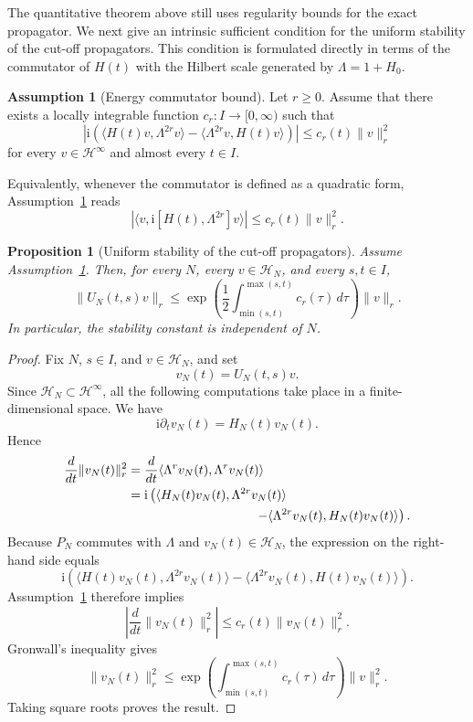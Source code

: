 \documentclass[11pt]{amsart}
\theoremstyle{plain}
\newtheorem{proposition}[theorem]{Proposition}
\theoremstyle{definition}
\newtheorem{assumption}[theorem]{Assumption}
\theoremstyle{remark}
\newcommand{\Hilb}{\mathcal H}
\newcommand{\ii}{\mathrm i}
\begin{document}
The quantitative theorem above still uses regularity bounds for the exact
propagator. We next give an intrinsic sufficient condition for the uniform
stability of the cut-off propagators. This condition is formulated directly
in terms of the commutator of \(H(t)\) with the Hilbert scale generated by
\(\Lambda=1+H_{0}\).

\begin{assumption}[Energy commutator bound]
\label{ass:energy-commutator-bound}
Let \(r\geq 0\). Assume that there exists a locally integrable function
\(c_{r}:I\to[0,\infty)\) such that
\[
\left|
\ii
\left(
\langle H(t)v,\Lambda^{2r}v\rangle
-
\langle \Lambda^{2r}v,H(t)v\rangle
\right)
\right|
\leq
c_{r}(t)\|v\|_{r}^{2}
\]
for every \(v\in\Hilb^{\infty}\) and almost every \(t\in I\).
\end{assumption}

Equivalently, whenever the commutator is defined as a quadratic form,
Assumption~\ref{ass:energy-commutator-bound} reads
\[
\left|
\langle v,\ii[H(t),\Lambda^{2r}]v\rangle
\right|
\leq
c_{r}(t)\|v\|_{r}^{2}.
\]

\begin{proposition}[Uniform stability of the cut-off propagators]
\label{prop:uniform-cutoff-stability}
Assume Assumption~\ref{ass:energy-commutator-bound}. Then, for every \(N\),
every \(v\in\Hilb_{N}\), and every \(s,t\in I\),
\[
\|U_{N}(t,s)v\|_{r}
\leq
\exp\left(
\frac{1}{2}
\int_{\min(s,t)}^{\max(s,t)}c_{r}(\tau)\,d\tau
\right)
\|v\|_{r}.
\]
In particular, the stability constant is independent of \(N\).
\end{proposition}

\begin{proof}
Fix \(N\), \(s\in I\), and \(v\in\Hilb_{N}\), and set
\[
v_{N}(t)=U_{N}(t,s)v.
\]
Since \(\Hilb_{N}\subset\Hilb^{\infty}\), all the following
computations take place in a finite-dimensional space. We have
\[
\ii\partial_{t}v_{N}(t)=H_{N}(t)v_{N}(t).
\]
Hence
\[
\begin{split}
\frac{d}{dt}\|v_{N}(t)\|_{r}^{2}
&=
\frac{d}{dt}
\langle \Lambda^{r}v_{N}(t),\Lambda^{r}v_{N}(t)\rangle
\\
&=
\ii
\left(
\langle H_{N}(t)v_{N}(t),\Lambda^{2r}v_{N}(t)\rangle
\right.
\\
&\hspace{35mm}\left.
-
\langle \Lambda^{2r}v_{N}(t),H_{N}(t)v_{N}(t)\rangle
\right).
\end{split}
\]
Because \(P_{N}\) commutes with \(\Lambda\) and
\(v_{N}(t)\in\Hilb_{N}\), the expression on the right-hand side equals
\[
\ii
\left(
\langle H(t)v_{N}(t),\Lambda^{2r}v_{N}(t)\rangle
-
\langle \Lambda^{2r}v_{N}(t),H(t)v_{N}(t)\rangle
\right).
\]
Assumption~\ref{ass:energy-commutator-bound} therefore implies
\[
\left|
\frac{d}{dt}\|v_{N}(t)\|_{r}^{2}
\right|
\leq
c_{r}(t)\|v_{N}(t)\|_{r}^{2}.
\]
Gronwall's inequality gives
\[
\|v_{N}(t)\|_{r}^{2}
\leq
\exp\left(
\int_{\min(s,t)}^{\max(s,t)}c_{r}(\tau)\,d\tau
\right)
\|v\|_{r}^{2}.
\]
Taking square roots proves the result.
\end{proof}
\end{document}
